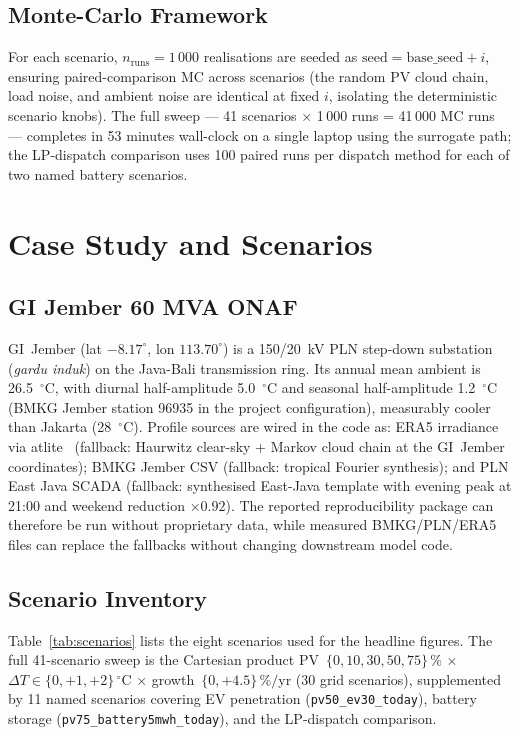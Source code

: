 \documentclass[conference]{IEEEtran}
\begin{document}
\subsection{Monte-Carlo Framework}
For each scenario, $n_{\text{runs}} = 1\,000$ realisations are seeded as $\text{seed} = \text{base\_seed} + i$, ensuring paired-comparison MC across scenarios (the random PV cloud chain, load noise, and ambient noise are identical at fixed $i$, isolating the deterministic scenario knobs). The full sweep --- 41 scenarios $\times$ 1\,000 runs = 41\,000 MC runs --- completes in 53 minutes wall-clock on a single laptop using the surrogate path; the LP-dispatch comparison uses 100 paired runs per dispatch method for each of two named battery scenarios.

\section{Case Study and Scenarios}
\label{sec:case}

\subsection{GI Jember 60 MVA ONAF}
GI~Jember (lat $-8.17^\circ$, lon $113.70^\circ$) is a 150/20~kV PLN step-down substation (\textit{gardu induk}) on the Java-Bali transmission ring. Its annual mean ambient is 26.5~$^\circ$C, with diurnal half-amplitude 5.0~$^\circ$C and seasonal half-amplitude 1.2~$^\circ$C (BMKG Jember station 96935 in the project configuration), measurably cooler than Jakarta (28~$^\circ$C). Profile sources are wired in the code as: ERA5 irradiance via atlite~\cite{hofmann2021atlite,hersbach2020era5} (fallback: Haurwitz clear-sky + Markov cloud chain at the GI~Jember coordinates); BMKG Jember CSV (fallback: tropical Fourier synthesis); and PLN East Java SCADA (fallback: synthesised East-Java template with evening peak at 21:00 and weekend reduction $\times 0.92$). The reported reproducibility package can therefore be run without proprietary data, while measured BMKG/PLN/ERA5 files can replace the fallbacks without changing downstream model code.

\subsection{Scenario Inventory}
Table~\ref{tab:scenarios} lists the eight scenarios used for the headline figures. The full 41-scenario sweep is the Cartesian product PV~$\{0,10,30,50,75\}\,\%$ $\times$ $\Delta T \in \{0,+1,+2\}\,^\circ$C $\times$ growth~$\{0,+4.5\}\,\%/$yr (30 grid scenarios), supplemented by 11 named scenarios covering EV penetration (\texttt{pv50\_ev30\_today}), battery storage (\texttt{pv75\_battery5mwh\_today}), and the LP-dispatch comparison.
\end{document}
